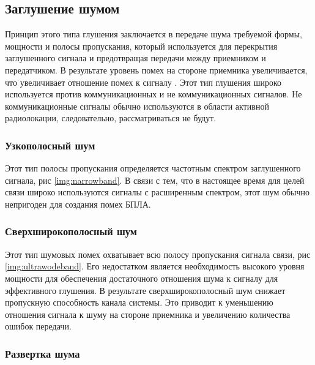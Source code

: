 \subsection{Заглушение шумом}

Принцип этого типа глушения заключается в передаче шума требуемой формы, мощности и полосы пропускания, который используется для перекрытия заглушенного сигнала и предотвращая передачи между приемником и передатчиком. В результате уровень помех на стороне приемника увеличивается, что увеличивает отношение помех к сигналу \cite{signaltointer}. Этот тип глушения широко используется против коммуникационных и не коммуникационных сигналов. Не коммуникационные сигналы обычно используются в области активной радиолокации, следовательно, рассматриваться не будут.

\subsubsection{Узкополосный шум}

Этот тип полосы пропускания определяется частотным спектром заглушенного сигнала, рис \ref{img:narrowband}. В связи с тем, что в настоящее время для целей связи широко используются сигналы с расширенным спектром, этот шум обычно непригоден для создания помех БПЛА.


\FloatBarrier

\subsubsection{Сверхширокополосный шум}

Этот тип шумовых помех охватывает всю полосу пропускания сигнала связи, рис \ref{img:ultrawodeband}. Его недостатком является необходимость высокого уровня мощности для обеспечения достаточного отношения шума к сигналу для эффективного глушения. В результате сверхширокополосный шум снижает пропускную способность канала системы. Это приводит к уменьшению отношения сигнала к шуму на стороне приемника и увеличению количества ошибок передачи.


\FloatBarrier

\subsubsection{Развертка шума}
 
